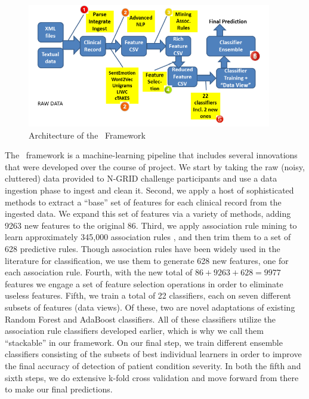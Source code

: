 \begin{figure}[h!t]
	\centering
	\includegraphics[width=0.95\textwidth]{figures/arch.png}
	\caption{Architecture of the \CREATE\ Framework}	
	\label{fig:arch}
\end{figure} 

The \CREATE\ framework is a machine-learning pipeline that includes several innovations that were developed over the course of project. We start by taking the raw (noisy, cluttered) data provided to N-GRID challenge participants and use a data ingestion phase to ingest and clean it.
Second, we apply a host of sophisticated methods to extract a ``base'' set of  features for each clinical record from the ingested data. We expand this set of features
via a variety of methods, adding 9263 new features to the original 86. 
Third, we apply association rule mining to learn approximately 345,000 association rules
\cite{fpgrowth,c5}, and then trim them to a set of 628 predictive rules. Though association rules have been widely used in the literature for classification, we use them to generate 628 new features, one for each association rule.
Fourth, with the new total of $86+9263+628=9977$ features we engage a set of 
feature selection operations in order to eliminate useless features. 
Fifth, we train a total of 22 classifiers, each on seven different subsets
of features (data views). Of these, two are novel adaptations of existing Random Forest \cite{ho95,breiman01} and AdaBoost \cite{adaboost} classifiers. 
All of these classifiers utilize the association rule classifiers developed earlier,
which is why we call them ``stackable'' in our framework. On our final step, 
we train different ensemble classifiers consisting of the subsets of best 
individual learners in order to improve the final accuracy of detection of
patient condition severity. In both the fifth and sixth steps, we do extensive k-fold cross validation and move forward from there to make our final predictions.

